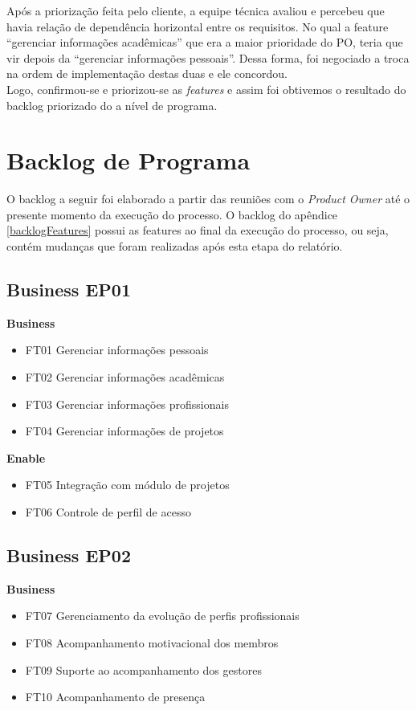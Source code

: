 Após a priorização feita pelo cliente, a equipe técnica avaliou e percebeu que havia relação de dependência horizontal entre os requisitos. No qual a feature “gerenciar informações acadêmicas” que era a maior prioridade do PO, teria que vir depois da “gerenciar informações pessoais”. Dessa forma, foi negociado a troca na ordem de implementação destas duas e ele concordou.\\

Logo, confirmou-se e priorizou-se as \textit{features} e assim foi obtivemos o resultado do backlog priorizado do a nível de programa.\\

\section{Backlog de Programa}

O backlog a seguir foi elaborado a partir das reuniões com o \textit{Product Owner} até o presente momento da execução do processo. O backlog do apêndice \ref{backlogFeatures} possui as features ao final da execução do processo, ou seja, contém mudanças que foram realizadas após esta etapa do relatório.

\subsection{Business EP01}
\textbf{Business}
\begin{itemize}
    \item FT01 Gerenciar informações pessoais
    \item FT02 Gerenciar informações acadêmicas
    \item FT03 Gerenciar informações profissionais
    \item FT04 Gerenciar informações de projetos
\end{itemize}
\textbf{Enable}
\begin{itemize}
    \item FT05 Integração com módulo de projetos
    \item FT06 Controle de perfil de acesso
\end{itemize}
\subsection{Business EP02}
\textbf{Business}
\begin{itemize}
    \item FT07 Gerenciamento da evolução de perfis profissionais
    \item FT08 Acompanhamento motivacional dos membros
    \item FT09 Suporte ao acompanhamento dos gestores
    \item FT10 Acompanhamento de presença
\end{itemize}

